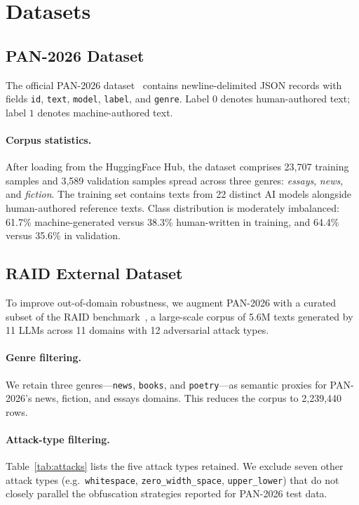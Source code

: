 \section{Datasets}
\label{sec:data}

\subsection{PAN-2026 Dataset}
\label{subsec:pan26data}

The official PAN-2026 dataset~\cite{bevendorff:2025} contains newline-delimited JSON records
with fields \texttt{id}, \texttt{text}, \texttt{model}, \texttt{label}, and \texttt{genre}.
Label $0$ denotes human-authored text; label $1$ denotes machine-authored text.

\paragraph{Corpus statistics.}
After loading from the HuggingFace Hub, the dataset comprises 23,707 training samples
and 3,589 validation samples spread across three genres: \textit{essays}, \textit{news},
and \textit{fiction}.  The training set contains texts from 22 distinct AI models
alongside human-authored reference texts.  Class distribution is moderately imbalanced:
61.7\% machine-generated versus 38.3\% human-written in training, and 64.4\% versus
35.6\% in validation.

\subsection{RAID External Dataset}
\label{subsec:raiddata}

To improve out-of-domain robustness, we augment PAN-2026 with a curated subset of the
RAID benchmark~\cite{dugan:2024}, a large-scale corpus of 5.6M texts generated by 11
LLMs across 11 domains with 12 adversarial attack types.

\paragraph{Genre filtering.}
We retain three genres—\texttt{news}, \texttt{books}, and \texttt{poetry}—as
semantic proxies for PAN-2026's news, fiction, and essays domains.  This reduces the
corpus to 2,239,440 rows.

\paragraph{Attack-type filtering.}
Table~\ref{tab:attacks} lists the five attack types retained.  We exclude seven other
attack types (e.g.\ \texttt{whitespace}, \texttt{zero\_width\_space}, \texttt{upper\_lower})
that do not closely parallel the obfuscation strategies reported for PAN-2026 test data.

